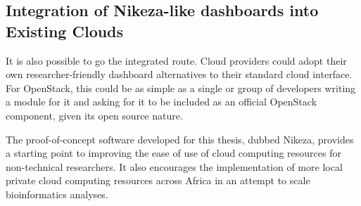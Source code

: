 \subsection{Integration of Nikeza-like dashboards into Existing Clouds}
It is also possible to go the integrated route. Cloud providers could adopt their own researcher-friendly dashboard alternatives to their standard cloud interface. For OpenStack, this could be as simple as a single or group of developers writing a module for it and asking for it to be included as an official OpenStack component, given its open source nature.

The proof-of-concept software developed for this thesis, dubbed Nikeza, provides a starting point to improving the ease of use of cloud computing resources for non-technical researchers. It also encourages the implementation of more local private cloud computing resources across Africa in an attempt to scale bioinformatics analyses.
